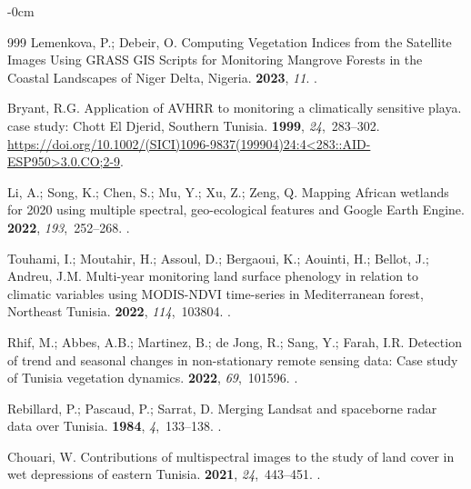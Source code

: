 \documentclass[land,article,accept,pdftex,moreauthors]{Definitions/mdpi}
\begin{document}
\begin{adjustwidth}{-\extralength}{0cm}
\begin{thebibliography}{999}
Lemenkova, P.; Debeir, O.
\newblock Computing Vegetation Indices from the Satellite Images Using GRASS
  GIS Scripts for Monitoring Mangrove Forests in the Coastal Landscapes of
  Niger Delta, Nigeria.
 {\bf 2023}, {\em 11}.
.

Bryant, R.G.
\newblock Application of AVHRR to monitoring a climatically sensitive playa.
  case study: Chott El Djerid, Southern Tunisia.
 {\bf 1999}, {\em
  24},~283--302.
\newblock
  {\url{https://doi.org/10.1002/(SICI)1096-9837(199904)24:4<283::AID-ESP950>3.0.CO;2-9}}.

Li, A.; Song, K.; Chen, S.; Mu, Y.; Xu, Z.; Zeng, Q.
\newblock Mapping African wetlands for 2020 using multiple spectral,
  geo-ecological features and Google Earth Engine.
 {\bf 2022},
  {\em 193},~252--268.
.

Touhami, I.; Moutahir, H.; Assoul, D.; Bergaoui, K.; Aouinti, H.; Bellot, J.;
  Andreu, J.M.
\newblock Multi-year monitoring land surface phenology in relation to climatic
  variables using MODIS-NDVI time-series in Mediterranean forest, Northeast
  Tunisia.
 {\bf 2022}, {\em 114},~103804.
.

Rhif, M.; Abbes, A.B.; Martinez, B.; {de Jong}, R.; Sang, Y.; Farah, I.R.
\newblock Detection of trend and seasonal changes in non-stationary remote
  sensing data: Case study of Tunisia vegetation dynamics.
 {\bf 2022}, {\em 69},~101596.
.

Rebillard, P.; Pascaud, P.; Sarrat, D.
\newblock Merging Landsat and spaceborne radar data over Tunisia.
 {\bf 1984}, {\em 4},~133--138.
.

Chouari, W.
\newblock Contributions of multispectral images to the study of land cover in
  wet depressions of eastern Tunisia.
 {\bf
  2021}, {\em 24},~443--451.
.


\end{thebibliography}
\end{adjustwidth}
\end{document}
